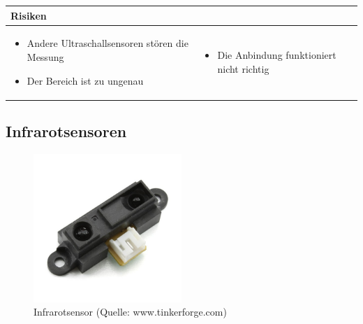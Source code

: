 \begin{table}[h]
\begin{tabular}{p{}p{}}


 \textbf{Risiken} & \\ \hline
	 
\begin{itemize}
\item Andere Ultraschallsensoren stören die Messung
\item Der Bereich ist zu ungenau
\end{itemize}
&
\begin{itemize}
\item Die Anbindung funktioniert nicht richtig
\end{itemize}

 
\end{tabular}
\end{table}

\pagebreak

\subsection{Infrarotsensoren}
\begin{figure}[h]
	\centering
	\includegraphics[width=0.5\textwidth]{fig/Infrarotsensor.jpg}
	\caption{Infrarotsensor (Quelle: www.tinkerforge.com)}
\end{figure}

